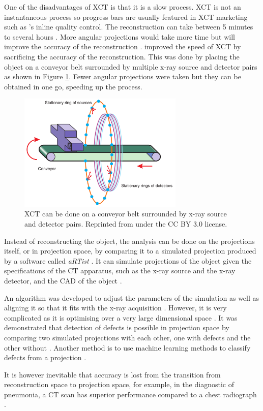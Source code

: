 One of the disadvantages of XCT is that it is a slow process. XCT is not an instantaneous process so progress bars are usually featured in XCT marketing such as \cite{nikon2015inline}'s inline quality control. The reconstruction can take between 5 minutes to several hours \citep{warnett2016towards}. More angular projections would take more time but will improve the accuracy of the reconstruction \citep{kruth2011computed}. \cite{warnett2016towards} improved the speed of XCT by sacrificing the accuracy of the reconstruction. This was done by placing the object on a conveyor belt surrounded by multiple x-ray source and detector pairs as shown in Figure \ref{fig:literature_conveyor}. Fewer angular projections were taken but they can be obtained in one go, speeding up the process.

\begin{figure}
  \centering
  \includegraphics[width=0.7\textwidth]{../figures/literatureReview/literature_conveyor.png}
  \caption{XCT can be done on a conveyor belt surrounded by x-ray source and detector pairs. Reprinted from \cite{warnett2016towards} under the CC BY 3.0 license.}
  \label{fig:literature_conveyor}
\end{figure}

Instead of reconstructing the object, the analysis can be done on the projections itself, or in projection space, by comparing it to a simulated projection produced by a software called \emph{aRTist} \citep{bellon2007artist, jaenisch2008artist, bellon2012radiographic}. It can simulate projections of the object given the specifications of the CT apparatus, such as the x-ray source and the x-ray detector, and the CAD of the object \citep{bellon2011simulation, deresch2012simulating}.

An algorithm was developed to adjust the parameters of the simulation as well as aligning it so that it fits with the x-ray acquisition \citep{brierley2018optimized}. However, it is very complicated as it is optimising over a very large dimensional space \citep{brierley2018optimized}. It was demonstrated that detection of defects is possible in projection space by comparing two simulated projections with each other, one with defects and the other without \citep{brierley2018optimized}. Another method is to use machine learning methods to classify defects from a projection \citep{rale2009comparison}.

It is however inevitable that accuracy is lost from the transition from reconstruction space to projection space, for example, in the diagnostic of pneumonia, a CT scan has superior performance compared to a chest radiograph \citep{hayden2009chest}.